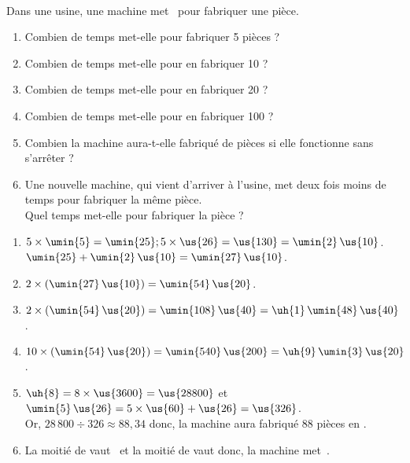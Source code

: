  \begin{corrige}
    \ \\ [-5mm]
    Dans une usine, une machine met \, pour fabriquer une pièce.

    \begin{enumerate}
       \item Combien de temps met-elle pour fabriquer 5 pièces ?
       \item Combien de temps met-elle pour en fabriquer 10 ?
       \item Combien de temps met-elle pour en fabriquer 20 ?
       \item Combien de temps met-elle pour en fabriquer 100 ?
       \item Combien la machine aura-t-elle fabriqué de pièces si elle fonctionne  sans s’arrêter ?
       \item Une nouvelle machine, qui vient d’arriver à l’usine, met deux fois moins de temps pour fabriquer la même pièce. \\
       Quel temps met-elle pour fabriquer la pièce ?
    \end{enumerate}

    \smallskip
    {\red
    \begin{enumerate}
       \item $5\times\umin{5} =\umin{25} ; 5\times\us{26} =\us{130} =\umin{2}\,\us{10}$. \\
          $\umin{25}+\umin{2}\,\us{10} = \umin{27}\,\us{10}$.
       \item $2\times(\umin{27}\,\us{10}) = \umin{54}\,\us{20}$.
       \item $2\times(\umin{54}\,\us{20}) =\umin{108}\,\us{40} = \uh{1}\,\umin{48}\,\us{40}$.
       \item $10\times(\umin{54}\,\us{20}) =\umin{540}\,\us{200} = \uh{9}\,\umin{3}\,\us{20}$.
       \item $\uh{8} =8\times\us{3600} =\us{28800}$ et $\umin{5}\,\us{26} =5\times\us{60}+\us{26} =\us{326}$. \\
       Or, $28\,800\div326 \approx88,34$ donc, { la machine aura fabriqué 88 pièces en }.
       \item La moitié de  vaut \, et la moitié de  vaut  donc, la machine met \,.
    \end{enumerate}
    }
 \end{corrige}